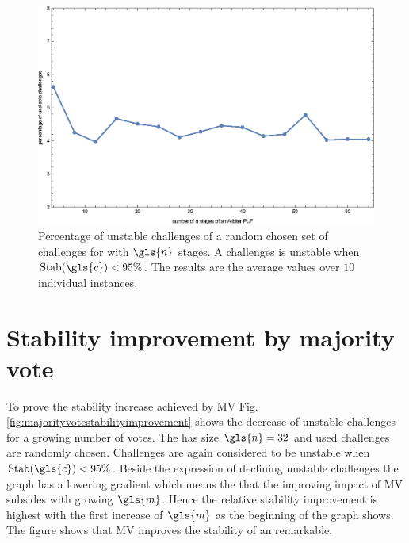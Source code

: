 \begin{figure}[ht]
\includegraphics[width=1.00\textwidth]{images/stages-stab-simulation.eps}
\caption{Percentage of unstable challenges of a random chosen set of challenges for \apufs with $\gls{n}$ stages. 
A challenges is unstable when $\Stab(\gls{c}) < 95 \%$. 
The results are the average values over $10$ individual \puf instances.} 
\label{fig:arbiterstabilities}
\end{figure}


\section{Stability improvement by majority vote}

To prove the stability increase achieved by \ac{MV} Fig. \ref{fig:majorityvotestabilityimprovement} shows the decrease of unstable challenges for a growing number of votes.
The \mpuf has size $\gls{n} = 32$ and used challenges are randomly chosen.
Challenges are again considered to be unstable when $\Stab(\gls{c}) < 95 \%$.
Beside the expression of declining unstable challenges the graph has a lowering gradient which means the that the improving impact of \ac{MV} subsides with growing $\gls{m}$.
Hence the relative stability improvement is highest with the first increase of $\gls{m}$ as the beginning of the graph shows.
The figure shows that \ac{MV} improves the stability of an \apuf remarkable. 

